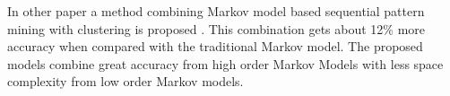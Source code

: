 In other paper a method combining Markov model based sequential pattern
mining with clustering is proposed \cite{Anitha_anew}. This combination gets
about 12\% more accuracy when compared with the traditional Markov model.
The proposed models combine great accuracy from high order Markov Models with
less space complexity from low order Markov models.


